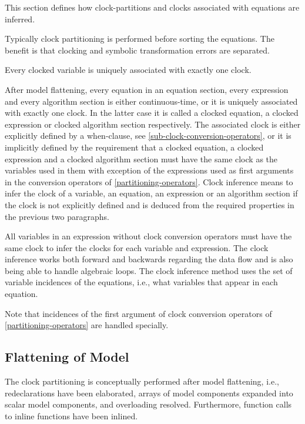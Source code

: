 This section defines how clock-partitions and clocks associated with
equations are inferred.

\begin{nonnormative}
Typically clock partitioning is performed before sorting the equations.  The benefit is that clocking and symbolic transformation errors are separated.
\end{nonnormative}

Every clocked variable is uniquely associated with exactly one clock.

After model flattening, every equation in an equation section, every
expression and every algorithm section is either continuous-time, or it
is uniquely associated with exactly one clock. In the latter case it is
called a clocked equation, a clocked expression or clocked algorithm
section respectively. The associated clock is either explicitly defined
by a when-clause, see \cref{sub-clock-conversion-operators}, or it is implicitly defined by the
requirement that a clocked equation, a clocked expression and a clocked
algorithm section must have the same clock as the variables used in them
with exception of the expressions used as first arguments in the
conversion operators of \cref{partitioning-operators}. Clock inference means to infer the
clock of a variable, an equation, an expression or an algorithm section
if the clock is not explicitly defined and is deduced from the required
properties in the previous two paragraphs.

All variables in an expression without clock conversion operators must
have the same clock to infer the clocks for each variable and
expression. The clock inference works both forward and backwards
regarding the data flow and is also being able to handle algebraic
loops. The clock inference method uses the set of variable incidences of
the equations, i.e., what variables that appear in each equation.

Note that incidences of the first argument of clock conversion operators
of \cref{partitioning-operators} are handled specially.

\subsection{Flattening of Model}\label{flattening-of-model}

The clock partitioning is conceptually performed after model flattening,
i.e., redeclarations have been elaborated, arrays of model components
expanded into scalar model components, and overloading resolved.
Furthermore, function calls to inline functions have been inlined.

